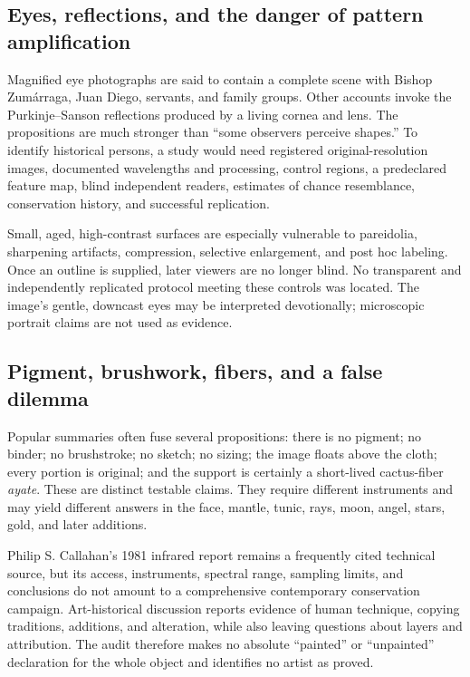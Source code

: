 \subsection{Eyes, reflections, and the danger of pattern amplification}

Magnified eye photographs are said to contain a complete scene with Bishop Zumárraga, Juan Diego, servants, and family groups. Other accounts invoke the Purkinje--Sanson reflections produced by a living cornea and lens. The propositions are much stronger than “some observers perceive shapes.” To identify historical persons, a study would need registered original-resolution images, documented wavelengths and processing, control regions, a predeclared feature map, blind independent readers, estimates of chance resemblance, conservation history, and successful replication.

Small, aged, high-contrast surfaces are especially vulnerable to pareidolia, sharpening artifacts, compression, selective enlargement, and post hoc labeling. Once an outline is supplied, later viewers are no longer blind. No transparent and independently replicated protocol meeting these controls was located. The image's gentle, downcast eyes may be interpreted devotionally; microscopic portrait claims are not used as evidence.

\subsection{Pigment, brushwork, fibers, and a false dilemma}

Popular summaries often fuse several propositions: there is no pigment; no binder; no brushstroke; no sketch; no sizing; the image floats above the cloth; every portion is original; and the support is certainly a short-lived cactus-fiber \emph{ayate}. These are distinct testable claims. They require different instruments and may yield different answers in the face, mantle, tunic, rays, moon, angel, stars, gold, and later additions.

Philip S. Callahan's 1981 infrared report remains a frequently cited technical source, but its access, instruments, spectral range, sampling limits, and conclusions do not amount to a comprehensive contemporary conservation campaign. Art-historical discussion reports evidence of human technique, copying traditions, additions, and alteration, while also leaving questions about layers and attribution. The audit therefore makes no absolute “painted” or “unpainted” declaration for the whole object and identifies no artist as proved.

